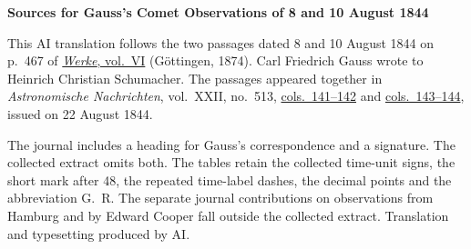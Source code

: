 \clearpage\thispagestyle{empty}
\begin{center}\textbf{Sources for Gauss’s Comet Observations of 8 and 10 August 1844}\end{center}
\noindent This AI translation follows the two passages dated 8 and 10 August 1844 on p.~467 of \href{https://gdz.sub.uni-goettingen.de/id/PPN236007467}{\textit{Werke}, vol.~VI} (Göttingen, 1874). Carl Friedrich Gauss wrote to Heinrich Christian Schumacher. The passages appeared together in \textit{Astronomische Nachrichten}, vol.~XXII, no.~513, \href{https://api.digitale-sammlungen.de/iiif/image/v2/bsb10049447_00079/full/1800,/0/default.jpg}{cols.~141--142} and \href{https://api.digitale-sammlungen.de/iiif/image/v2/bsb10049447_00080/full/1800,/0/default.jpg}{cols.~143--144}, issued on 22 August 1844.
\par\smallskip\noindent The journal includes a heading for Gauss’s correspondence and a signature. The collected extract omits both. The tables retain the collected time-unit signs, the short mark after 48, the repeated time-label dashes, the decimal points and the abbreviation G.~R. The separate journal contributions on observations from Hamburg and by Edward Cooper fall outside the collected extract. Translation and typesetting produced by AI.
\clearpage
